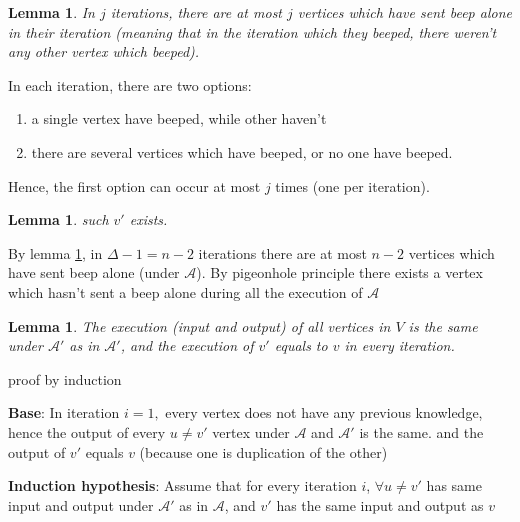 \documentclass[11pt]{article}
\newtheorem{lemma}[theorem]{Lemma}
\begin{document}
\begin{lemma}
\label{single_beep_j_iterations}
In $j$ iterations, there are at most $j$ vertices which have sent beep alone in their iteration (meaning that in the iteration which they beeped, there weren't any other vertex which beeped).
\end{lemma}
In each iteration, there are two options:
\begin{enumerate}
    \item a single vertex have beeped, while other haven't
    \item there are several vertices which have beeped, or no one have beeped.
\end{enumerate}
Hence, the first option can occur at most $j$ times (one per iteration).

\begin{lemma}
\label{v_exists}
such $v'$ exists.
\end{lemma}
By lemma \ref{single_beep_j_iterations}, in $\Delta-1 = n-2$ iterations there are at most $n-2$ vertices which have sent beep alone (under \(\mathcal{A}\)). By pigeonhole principle there exists a vertex which hasn't sent a beep alone during all the execution of \(\mathcal{A}\)

\begin{lemma}
The execution (input and output) of all vertices in $V$ is the same under \(\mathcal{A'}\) as in  \(\mathcal{A'}\), and the execution of $v'$ equals to $v$ in every iteration.
\end{lemma}
proof by induction

\textbf{Base}: In iteration $i=1,$ every vertex does not have any previous knowledge, hence the output of every $u\ne v'$ vertex under \(\mathcal{A}\) and \(\mathcal{A'}\) is the same. and the output of $v'$ equals $v$ (because one is duplication of the other)


\textbf{Induction hypothesis}: Assume that for every iteration $i$, $\forall u \ne v'$ has same input and output under \(\mathcal{A'}\) as in \(\mathcal{A}\), and $v'$ has the same input and output as $v$
\end{document}
